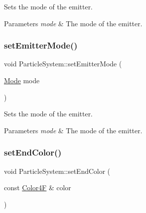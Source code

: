 Sets the mode of the emitter.


\begin{DoxyParams}{Parameters}
{\em mode} & The mode of the emitter. \\
\hline
\end{DoxyParams}
\mbox{\label{classParticleSystem_aeac528ed49a4782003bf21aeb5e321d4}} 
\subsubsection{\texorpdfstring{set\+Emitter\+Mode()}{setEmitterMode()}\hspace{0.1cm}{\footnotesize\ttfamily [2/2]}}
{\footnotesize\ttfamily void Particle\+System\+::set\+Emitter\+Mode (\begin{DoxyParamCaption}\item[{\hyperlink{classParticleSystem_aa380bd1c6062c44d56268a61ade9c8fb}{Mode}}]{mode }\end{DoxyParamCaption})\hspace{0.3cm}{\ttfamily [inline]}}

Sets the mode of the emitter.


\begin{DoxyParams}{Parameters}
{\em mode} & The mode of the emitter. \\
\hline
\end{DoxyParams}
\mbox{\label{classParticleSystem_a09c4f2ca4f9386d00a4e852de96bfa9c}} 
\subsubsection{\texorpdfstring{set\+End\+Color()}{setEndColor()}\hspace{0.1cm}{\footnotesize\ttfamily [1/2]}}
{\footnotesize\ttfamily void Particle\+System\+::set\+End\+Color (\begin{DoxyParamCaption}\item[{const \hyperlink{structColor4F}{Color4F} \&}]{color }\end{DoxyParamCaption})\hspace{0.3cm}{\ttfamily [inline]}}

